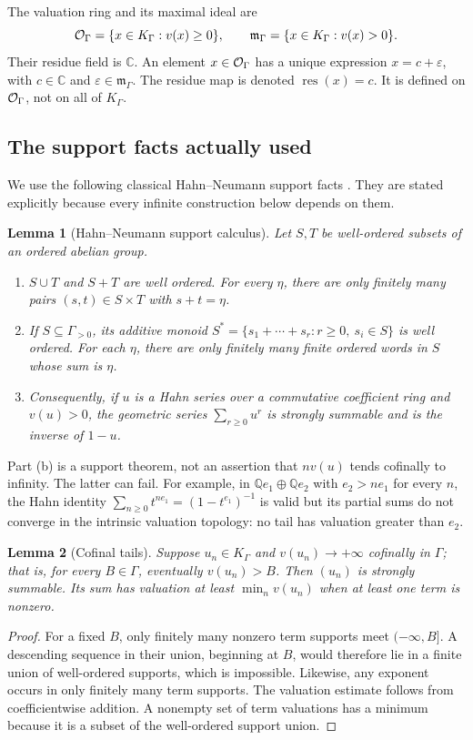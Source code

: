 \documentclass[11pt]{article}
\theoremstyle{plain}
\newtheorem{lemma}[lemma]{Lemma}
\theoremstyle{plain}
\theoremstyle{plain}
\theoremstyle{definition}
\theoremstyle{definition}
\theoremstyle{definition}
\theoremstyle{remark}
\newcommand{\C}{\mathbb C}\newcommand{\R}{\mathbb R}
\newcommand{\Q}{\mathbb Q}\newcommand{\Z}{\mathbb Z}\newcommand{\N}{\mathbb N}
\newcommand{\K}{K_\Gamma}\newcommand{\E}{\mathcal E_\Gamma}
\newcommand{\mm}{\mathfrak m_\Gamma}
\newcommand{\res}{\operatorname{res}}
\begin{document}
The valuation ring and its maximal ideal are
\[
 \OO=\{x\in\K:v(x)\ge0\},\qquad
 \mm=\{x\in\K:v(x)>0\}.
\]
Their residue field is $\C$. An element $x\in\mathcal O_\Gamma$ has a unique expression
$x=c+\varepsilon$, with $c\in\C$ and $\varepsilon\in\mm$. The residue
map is denoted $\res(x)=c$. It is defined on $\mathcal O_\Gamma$, not on all of $\K$.

\subsection{The support facts actually used}
We use the following classical Hahn--Neumann support facts
\cite[Section~3]{Poonen}\cite{vdH}. They are stated explicitly because
every infinite construction below depends on them.

\begin{lemma}[Hahn--Neumann support calculus]\label{lem:neumann}
Let $S,T$ be well-ordered subsets of an ordered abelian group.
\begin{enumerate}[label=\textnormal{(\alph*)},leftmargin=2em]
\item $S\cup T$ and $S+T$ are well ordered. For every $\eta$, there are
only finitely many pairs $(s,t)\in S\times T$ with $s+t=\eta$.
\item If $S\subseteq\Gamma_{>0}$, its additive monoid
$S^*=\{s_1+\cdots+s_r:r\ge0,\ s_i\in S\}$ is well ordered. For each
$\eta$, there are only finitely many finite ordered words in $S$ whose
sum is $\eta$.
\item Consequently, if $u$ is a Hahn series over a commutative
coefficient ring and $v(u)>0$, the geometric series
$\sum_{r\ge0}u^r$ is strongly summable and is the inverse of $1-u$.
\end{enumerate}
\end{lemma}

Part (b) is a support theorem, not an assertion that $nv(u)$ tends
cofinally to infinity. The latter can fail. For example, in
$\Q e_1\oplus\Q e_2$ with $e_2>ne_1$ for every $n$, the Hahn identity
$\sum_{n\ge0}t^{ne_1}=(1-t^{e_1})^{-1}$ is valid but its partial sums
do not converge in the intrinsic valuation topology: no tail has
valuation greater than $e_2$.

\begin{lemma}[Cofinal tails]\label{lem:cofinal-tails}
Suppose $u_n\in\K$ and $v(u_n)\to+\infty$ cofinally in $\Gamma$;
that is, for every $B\in\Gamma$, eventually $v(u_n)>B$. Then
$(u_n)$ is strongly summable. Its sum has valuation at least
$\min_n v(u_n)$ when at least one term is nonzero.
\end{lemma}
\begin{proof}
For a fixed $B$, only finitely many nonzero term supports meet
$(-\infty,B]$. A descending sequence in their union, beginning at
$B$, would therefore lie in a finite union of well-ordered supports,
which is impossible. Likewise, any exponent occurs in only finitely
many term supports. The valuation estimate follows from coefficientwise
addition. A nonempty set of term valuations has a minimum because it
is a subset of the well-ordered support union.
\end{proof}
\end{document}

